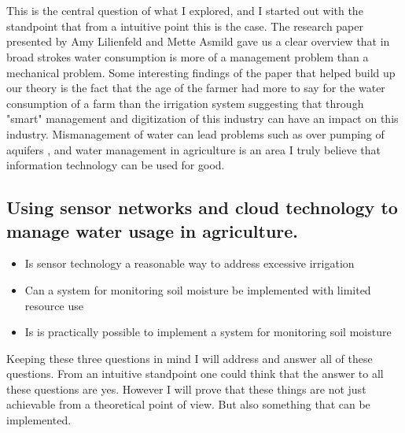 \documentclass[]{uiophd}
\begin{document}
\\\\
This is the central question of what I explored, and I started out with the standpoint that from a intuitive point this is the case. The research paper presented by Amy Lilienfeld and Mette Asmild gave us a clear overview that in broad strokes water consumption is more of a management problem than a mechanical problem. Some interesting findings of the paper that helped build up our theory is the fact that the age of the farmer had more to say for the water consumption of a farm than the irrigation system suggesting that through "smart" management and digitization of this industry can have an impact on this industry. Mismanagement of water can lead problems such as over pumping of aquifers \parencite{LILIENFELD200773}, and water management in agriculture is an area I truly believe that information technology can be used for good.

\subsection{Using sensor networks and cloud technology to manage water usage in agriculture.}
\begin{itemize}
  \item Is sensor technology a reasonable way to address excessive irrigation
  \item Can a system for monitoring soil moisture be implemented with limited resource use
  \item Is is practically possible to implement a system for monitoring soil moisture 
\end{itemize}
Keeping these three questions in mind I will address and answer all of these questions. From an intuitive standpoint one could think that the answer to all these questions are yes. However I will prove that these things are not just achievable from a theoretical point of view. But also something that can be implemented.
\end{document}
